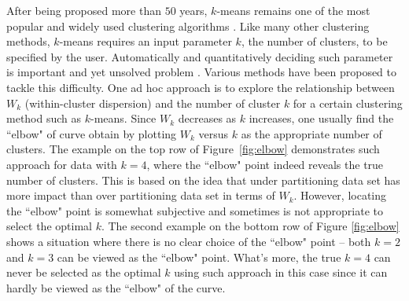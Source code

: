 \documentclass[11pt]{article}
\begin{document}
After being proposed more than $50$ years, $k$-means remains one of the most
popular and widely used clustering algorithms \citep{jain2010data}. Like many
other clustering methods, $k$-means requires an input parameter $k$, the
number of clusters, to be specified by the user. Automatically and
quantitatively deciding such parameter is important and yet unsolved problem
\citep{fujita2014non}. Various methods have been proposed to tackle this
difficulty. One ad hoc approach is to explore the relationship between $W_k$
(within-cluster dispersion) and the number of cluster $k$ for a certain
clustering method such as $k$-means. Since $W_k$ decreases as $k$ increases,
one usually find the ``elbow" of curve obtain by plotting $W_k$ versus $k$ as
the appropriate number of clusters. The example on the top row of
Figure~\ref{fig:elbow} demonstrates such approach for data with $k=4$, where
the ``elbow" point indeed reveals the true number of clusters. This is based
on the idea that under partitioning data set has more impact than over
partitioning data set in terms of $W_k$. However, locating the ``elbow" point
is somewhat subjective and sometimes is not appropriate to select the optimal
$k$. The second example on the bottom row of Figure \ref{fig:elbow} shows a
situation where there is no clear choice of the ``elbow" point -- both $k=2$
and $k=3$ can be viewed as the ``elbow" point. What's more, the true $k=4$ can
never be selected as the optimal $k$ using such approach in this case since it
can hardly be viewed as the ``elbow" of the curve.
\end{document}
